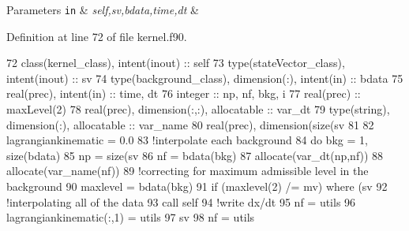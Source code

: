 \begin{DoxyParams}[1]{Parameters}
\mbox{\tt in}  & {\em self,sv,bdata,time,dt} & \\
\hline
\end{DoxyParams}


Definition at line 72 of file kernel.\+f90.


\begin{DoxyCode}
72     \textcolor{keywordtype}{class}(kernel\_class), \textcolor{keywordtype}{intent(inout)} :: self
73     \textcolor{keywordtype}{type}(stateVector\_class), \textcolor{keywordtype}{intent(inout)} :: sv
74     \textcolor{keywordtype}{type}(background\_class), \textcolor{keywordtype}{dimension(:)}, \textcolor{keywordtype}{intent(in)} :: bdata
75     \textcolor{keywordtype}{real(prec)}, \textcolor{keywordtype}{intent(in)} :: time, dt
76     \textcolor{keywordtype}{integer} :: np, nf, bkg, i
77     \textcolor{keywordtype}{real(prec)} :: maxLevel(2)
78     \textcolor{keywordtype}{real(prec)}, \textcolor{keywordtype}{dimension(:,:)}, \textcolor{keywordtype}{allocatable} :: var\_dt
79     \textcolor{keywordtype}{type}(string), \textcolor{keywordtype}{dimension(:)}, \textcolor{keywordtype}{allocatable} :: var\_name
80     \textcolor{keywordtype}{real(prec)}, \textcolor{keywordtype}{dimension(size(sv%
81 
82     lagrangiankinematic = 0.0
83     \textcolor{comment}{!interpolate each background}
84     \textcolor{keywordflow}{do} bkg = 1, \textcolor{keyword}{size}(bdata)
85         np = \textcolor{keyword}{size}(sv%
86         nf = bdata(bkg)%
87         \textcolor{keyword}{allocate}(var\_dt(np,nf))
88         \textcolor{keyword}{allocate}(var\_name(nf))
89         \textcolor{comment}{!correcting for maximum admissible level in the background}
90         maxlevel = bdata(bkg)%
91         \textcolor{keywordflow}{if} (maxlevel(2) /= mv) \textcolor{keywordflow}{where} (sv%
92         \textcolor{comment}{!interpolating all of the data}
93         \textcolor{keyword}{call }self%
94         \textcolor{comment}{!write dx/dt}
95         nf = utils%
96         lagrangiankinematic(:,1) = utils%
97         sv%
98         nf = utils%
}
\end{DoxyCode}
